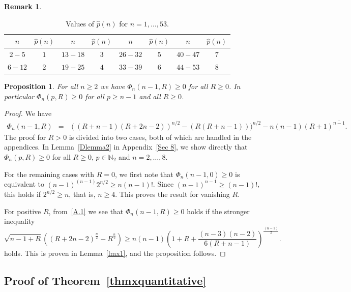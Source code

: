 \documentclass[11pt,a4paper,times]{amsart}
\theoremstyle{plain}
\newtheorem{proposition}{Proposition}[section]
\theoremstyle{definition}
\newtheorem{remark}{Remark}[section]
\numberwithin{equation}{section}
\newcommand{\N}{\mathbb{N}}
\begin{document}
{\begin{remark}
{\footnotesize
\begin{table}[h!]
\centering
\begin{tabular}{|c|c||c|c||c|c||c|c|}
\hline
$n$ & $\hat{p}(n)$ & $n$ & $\hat{p}(n)$ & $n$ & $\hat{p}(n)$ & $n$ & $\hat{p}(n)$\\
\hline
\rule{0pt}{10pt}
$2-5$ &$1$ &$13-18$ &$3$ &$26-32$ &$5$ &$40-47$ &$7$ \\
\hline
\rule{0pt}{10pt}
$6-12$ &$2$ &$19-25$ &$4$ &$33-39$ &$6$ &$44-53$ &$8$\\
 \hline
 \end{tabular}\vspace*{3mm}
 \caption{Values of $\hat{p}(n)$ for $n=1,\dots,53$.}
 \end{table}
 }
\end{remark}

\begin{proposition}\label{start} For all $n\geq 2$ we have  $\Phi_n(n-1,R)\geq 0$ for all $R\geq 0$. In particular $\Phi_n(p,R)\geq 0$ for all $p\geq n-1$ and all $R\geq 0$.
\end{proposition}
\begin{proof}
We have
\begin{eqnarray*}
\Phi_n(n-1,R)&=&((R+n-1)(R+2n-2))^{n/2}-(R(R+n-1)))^{n/2}-n(n-1)(R+1)^{\overline{n-1}}.
\end{eqnarray*}
The proof for $R>0$ is divided into two cases, both of which are handled in the appendices. In Lemma~\ref{Dlemma2} in Appendix~\ref{Sec 8}, 
we show directly that $\Phi_n(p,R)\geq 0$ for all $R\geq 0$, $p\in \N_2$ and $n=2, \ldots, 8$. 

For the remaining cases with $R=0$, we first note that $\Phi_n(n-1,0)\geq 0$  is equivalent to $(n-1)^{(n-1)}2^{n/2}\geq n(n-1)!$.
Since $(n-1)^{n-1}\geq (n-1)!$, this holds if $2^{n/2}\geq n$, that is, $n\geq 4$. This proves the result for vanishing $R$.

For positive $R$, from~\eqref{A.1} we see that $\Phi_n(n-1,R)\geq 0$ holds
 if the stronger inequality
 \begin{equation}\label{Ineq}
 \sqrt{n-1+R}\left( (R+2n-2)^{\frac{n}{2}}-R^{\frac{n}{2}}\right)
 \geq n(n-1)\left(1+R+\frac{(n-3)(n-2)}{6(R+n-1)}	\right)^{\frac{(n-1)}{2}}.
 \end{equation}
 holds. This is proven in Lemma~\ref{lmx1}, and the proposition follows.
 \end{proof}
%
\subsection{Proof of Theorem~\ref{thmxquantitative}}

}
\end{document}
